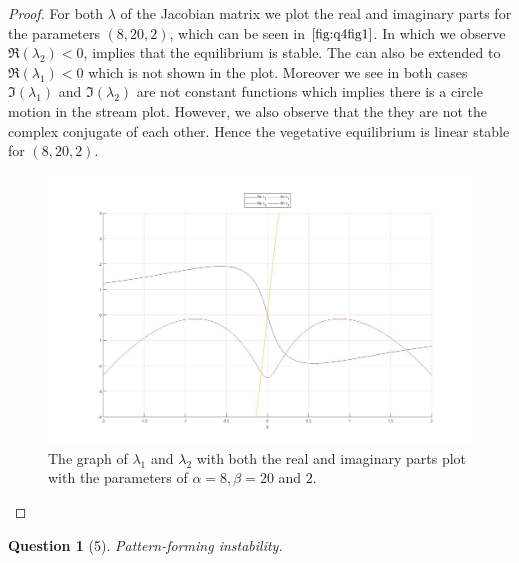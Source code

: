 \documentclass[11pt]{article}
\theoremstyle{quest}
\newtheorem*{question}{Question}
\begin{document}
\begin{proof}
    For both $\lambda$ of the Jacobian matrix we plot the real and imaginary parts for the 
    parameters $(8,20,2)$, which can be seen in $\ref{fig:q4fig1}$. In which we observe
    $\Re(\lambda_2) < 0 $, implies that the equilibrium is stable. The can also be extended
    to $\Re(\lambda_1) < 0$ which is not shown in the plot. 
    Moreover we see in both cases $\Im(\lambda_1)$ and $\Im(\lambda_2)$ are not constant functions
    which implies there is a circle motion in the stream plot. However, we also observe
    that the they are not the complex conjugate of each other.
    Hence the vegetative equilibrium is linear stable for $(8,20,2)$.
    \begin{figure}[h!]
        \includegraphics[width=\linewidth]{figures/Q4_fig1.jpg}
        \caption{The graph of $\lambda_1$ and $\lambda_2$ with both the real and imaginary parts
        plot with the parameters of $ \alpha = 8, \beta = 20 $ and $2$.}
        \label{fig:q4fig1}
    \end{figure}

     

\end{proof}
\clearpage
\begin{question}[5]
   Pattern-forming instability. 
\end{question}
\end{document}

